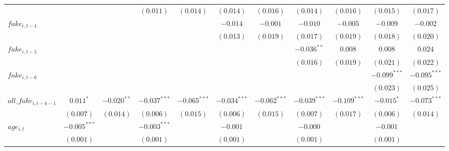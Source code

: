 \begin{table}
\begin{center}
\begin{tabular}{lcccccccccc}
                         &                &               & $(0.011)$      & $(0.014)$      & $(0.014)$      & $(0.016)$      & $(0.014)$      & $(0.016)$      & $(0.015)$      & $(0.017)$      \\
\addlinespace
$fake_{i, t-4}$         &                &               &                &                & $-0.014$       & $-0.001$       & $-0.010$       & $-0.005$       & $-0.009$       & $-0.002$       \\
                         &                &               &                &                & $(0.013)$      & $(0.019)$      & $(0.017)$      & $(0.019)$      & $(0.018)$      & $(0.020)$      \\
\addlinespace
$fake_{i, t-5}$         &                &               &                &                &                &                & $-0.036^{**}$  & $0.008$        & $0.008$        & $0.024$        \\
                         &                &               &                &                &                &                & $(0.016)$      & $(0.019)$      & $(0.021)$      & $(0.022)$      \\
\addlinespace
$fake_{i, t-6}$        &                &               &                &                &                &                &                &                & $-0.099^{***}$ & $-0.095^{***}$ \\
                         &                &               &                &                &                &                &                &                & $(0.023)$      & $(0.025)$      \\
\addlinespace
$all\_fake_{i, t-k-1}$  & $0.011^{*}$    & $-0.020^{**}$  & $-0.037^{***}$ & $-0.065^{***}$ & $-0.034^{***}$ & $-0.062^{***}$ & $-0.039^{***}$ & $-0.109^{***}$  & $-0.015^{*}$   & $-0.073^{***}$ \\
                         & $(0.007)$      & $(0.014)$ & $(0.006)$      & $(0.015)$      & $(0.006)$      & $(0.015)$  & $(0.007)$      & $(0.017)$  & $(0.006)$      & $(0.014)$        \\
\addlinespace
$age_{i,t}$                      & $-0.005^{***}$ &               & $-0.003^{***}$ &                & $-0.001$       &                & $-0.000$       &                & $-0.001$       &                \\
                         & $(0.001)$      &               & $(0.001)$      &                & $(0.001)$      &                & $(0.001)$      &                & $(0.001)$      &                \\

\end{tabular}
\end{center}
\end{table}
